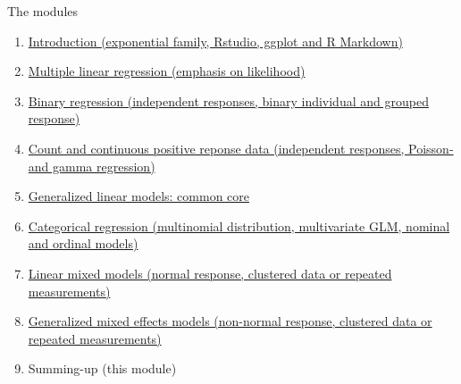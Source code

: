 \documentclass[
  ignorenonframetext,
]{beamer}
\begin{document}
\begin{frame}
\begin{block}{The modules}
\protect\hypertarget{the-modules}{}
\begin{enumerate}
\item
  \href{https://www.math.ntnu.no/emner/TMA4315/2023h/Module\%201/Module01IntroPresentation.pdf}{Introduction
  (exponential family, Rstudio, ggplot and R Markdown)}
\item
  \href{https://www.math.ntnu.no/emner/TMA4315/2023h/Module\%202/Module02MLRNotes.html}{Multiple
  linear regression (emphasis on likelihood)}
\item
  \href{https://www.math.ntnu.no/emner/TMA4315/2023h/Module\%203/Module03BinRegNotes.html}{Binary
  regression (independent responses, binary individual and grouped
  response)}
\item
  \href{https://www.math.ntnu.no/emner/TMA4315/2023h/Module\%204/Module04PoissonGammaNotes.html}{Count
  and continuous positive reponse data (independent responses, Poisson-
  and gamma regression)}
\item
  \href{https://www.math.ntnu.no/emner/TMA4315/2023h/Module\%205/Module05GLMNotesv.html}{Generalized
  linear models: common core}
\item
  \href{https://www.math.ntnu.no/emner/TMA4315/2023h/Module\%206/Module06CategoricalNotes.html}{Categorical
  regression (multinomial distribution, multivariate GLM, nominal and
  ordinal models)}
\item
  \href{https://www.math.ntnu.no/emner/TMA4315/2023h/Module\%207/Module07LMMNotes.html}{Linear
  mixed models (normal response, clustered data or repeated
  measurements)}
\item
  \href{https://www.math.ntnu.no/emner/TMA4315/2023h/Module\%208/Module08GLMMNotes.html}{Generalized
  mixed effects models (non-normal response, clustered data or repeated
  measurements)}
\item
  Summing-up (this module)
\end{enumerate}
\end{block}
\end{frame}
\end{document}
